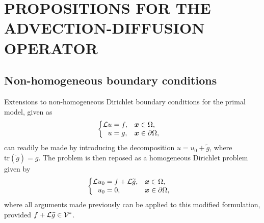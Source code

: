 \chapter{PROPOSITIONS FOR THE ADVECTION-DIFFUSION OPERATOR}
\label{chap:vmsapp}

\let\thefootnote\relax{}

\section{Non-homogeneous boundary conditions}
\label{app:bcs}

Extensions to non-homogeneous Dirichlet boundary conditions
for the primal model, given as
%
\begin{gather}
\begin{cases}
\begin{aligned}
\mathcal{L} u &= f, & & \boldsymbol{x} \in \Omega, \\
u &= g, & & \boldsymbol{x} \in \partial \Omega,
\end{aligned}
\end{cases}
\label{eq:bcs_primal_pde}
\end{gather}
%
can readily be made by introducing the decomposition
$u = u_0 + \tilde{g}$, where $\text{tr}({\tilde{g}}) = g$.
The problem is then reposed as a homogeneous
Dirichlet problem given by
%
\begin{gather}
\begin{cases}
\begin{aligned}
\mathcal{L} u_0 &= f + \mathcal{L} \widetilde{g}, & & \boldsymbol{x} \in \Omega, \\
u_0 &= 0, & & \boldsymbol{x} \in \partial \Omega,
\end{aligned}
\end{cases}
\end{gather}
%
where all arguments made previously can be applied to this
modified formulation, provided $f + \mathcal{L} \widetilde{g} \in \mathcal{V}^*$.

